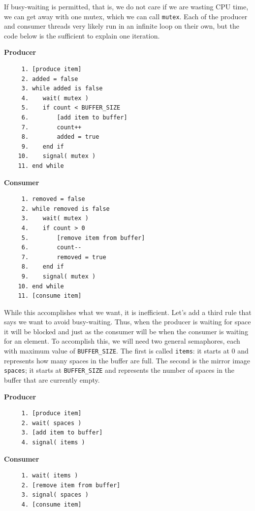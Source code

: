If busy-waiting is permitted, that is, we do not care if we are wasting CPU time, we can get away with one mutex, which we can call \texttt{mutex}. Each of the producer and consumer threads very likely run in an infinite loop on their own, but the code below is the sufficient to explain one iteration.

\begin{multicols}{2}
\textbf{Producer}\vspace{-2em}
  \begin{verbatim}
	 1. [produce item]
	 2. added = false
	 3. while added is false
	 4.    wait( mutex )
	 5.    if count < BUFFER_SIZE
	 6.        [add item to buffer]
	 7.        count++
	 8.        added = true
	 9.    end if
	10.    signal( mutex )
	11. end while
  \end{verbatim}
\columnbreak
\textbf{Consumer}\vspace{-2em}
  \begin{verbatim}
	 1. removed = false
	 2. while removed is false
	 3.    wait( mutex )
	 4.    if count > 0
	 5.        [remove item from buffer]
	 6.        count--
	 7.        removed = true
	 8.    end if
	 9.    signal( mutex )
	10. end while
	11. [consume item]
  \end{verbatim}
\end{multicols}
\vspace{-2em}


While this accomplishes what we want, it is inefficient. Let's add a third rule that says we want to avoid busy-waiting. Thus, when the producer is waiting for space it will be blocked and just as the consumer will be when the consumer is waiting for an element. To accomplish this, we will need two general semaphores, each with maximum value of \texttt{BUFFER\_SIZE}. The first is called \texttt{items}: it starts at 0 and represents how many spaces in the buffer are full. The second is the mirror image \texttt{spaces}; it starts at \texttt{BUFFER\_SIZE} and represents the number of spaces in the buffer that are currently empty.

\begin{multicols}{2}
\textbf{Producer}\vspace{-2em}
  \begin{verbatim}
	 1. [produce item]
	 2. wait( spaces )
	 3. [add item to buffer]
	 4. signal( items )
  \end{verbatim}
\columnbreak
\textbf{Consumer}\vspace{-2em}
  \begin{verbatim}
	 1. wait( items )
	 2. [remove item from buffer]
	 3. signal( spaces )
	 4. [consume item]
  \end{verbatim}
\end{multicols}
\vspace{-2em}

